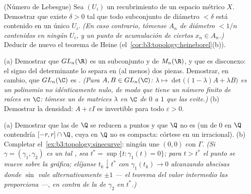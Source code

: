 \begin{exercise}[$\star\star$]\label{exo:b3:topology:7}
(Número de Lebesgue) Sea $(U_i)$ un recubrimiento  de un espacio
métrico  $X$. Demostrar que
existe $\delta > 0$ tal que todo subconjunto de diámetro $< \delta$ está
contenido en un único $U_i$. \emph{(En caso contrario, tómense $A_n$ de
diámetro $< 1/n$ contenidos en ningún $U_i$, y un punto de acumulación
de ciertos $x_n \in A_n$.)} Deducir de nuevo el teorema de Heine
(el~\cref{cor:b3:topology:heineborel}(b)).
\end{exercise}

\begin{exercise}[$\star\star$]\label{exo:b3:topology:8}
(a) Demostrar que $GL_n(\R)$ es un subconjunto  y
 de $M_n(\R)$, y que es
disconexo: el signo del determinante lo separa en (al menos) dos piezas.
Demostrar, en cambio, que $GL_n(\C)$ es
. \emph{(Para
$A, B \in GL_n(\C)$: $\lambda \mapsto \det\bigl((1 -
\lambda)A + \lambda B\bigr)$ es un polinomio no idénticamente nulo, de
modo que tiene un número finito de raíces en $\C$: tómese un
 de matrices $\lambda$ en
$\C$ de $0$ a $1$ que las evite.)} (b) Demostrar la densidad:
$A + \varepsilon I$ es invertible para todo
$\varepsilon > 0$.
\end{exercise}

\begin{exercise}[$\star\star$]\label{exo:b3:topology:9}
(a) Demostrar que las  de $\Q$ se reducen a puntos y que $\Q$ no es
 (un
 de $0$ en $\Q$ contendría
$[-r, r]\cap\Q$, cuya  en
$\Q$ no es compacta: córtese en un
irracional). (b) Completar el~\cref{ex:b3:topology:sinecurve}: ningún
 une $(0,0)$ con $\Gamma$.
\emph{(Si $\gamma = (\gamma_1, \gamma_2)$ es un tal
, sea
$t^* = \sup\{t : \gamma_1(t) = 0\}$; para $t
> t^*$ el punto se mueve sobre la gráfica; elíjanse $t_k \downarrow
t^*$ con $\gamma_1(t_k) \to 0$ alcanzando abscisas donde $\sin$ vale
alternativamente $\pm1$ --- el teorema del valor intermedio las
proporciona ---, en contra de la
 de $\gamma_2$ en
$t^*$.)}
\end{exercise}

